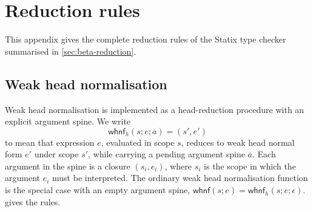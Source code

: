 \section{Reduction rules}
\label{app:reduction}

This appendix gives the complete reduction rules of the Statix type checker
summarised in \cref{sec:beta-reduction}.

\subsection{Weak head normalisation}

Weak head normalisation is implemented as a head-reduction procedure with an
explicit argument spine. We write
\[
\mathsf{whnf}_h(s; e; \overline{a}) = (s', e')
\]
to mean that expression \(e\), evaluated in scope \(s\), reduces to weak head
normal form \(e'\) under scope \(s'\), while carrying a pending argument spine
\(\overline{a}\). Each argument in the spine is a closure \((s_i,e_i)\), where
\(s_i\) is the scope in which the argument \(e_i\) must be interpreted. The
ordinary weak head normalisation function is the special case with an empty
argument spine, \(\mathsf{whnf}(s;e) = \mathsf{whnf}_h(s;e;\epsilon)\).
 gives the rules.

